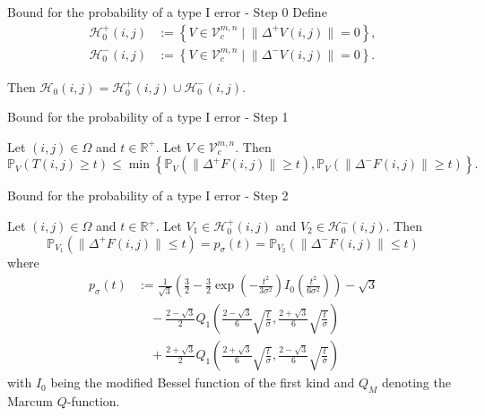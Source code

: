 \documentclass[presentation]{beamer}
\newcommand{\norm}[1]{\lVert#1\rVert}
\begin{document}
\begin{frame}{Bound for the probability of a type I error - Step 0}
	Define
	\begin{align*}
		\mathcal{H}_0^+(i, j) &:= \left\{ V \in \mathcal{V}_c^{m, n} \mid \norm{\Delta^+ V(i, j)} = 0 \right\}, \\
		\mathcal{H}_0^-(i, j) &:= \left\{ V \in \mathcal{V}_c^{m, n} \mid \norm{\Delta^- V(i, j)} = 0 \right\}.
	\end{align*}
	
	Then $\mathcal{H}_0(i, j) = \mathcal{H}_0^+(i, j) \cup \mathcal{H}_0^-(i, j)$.
\end{frame}

\begin{frame}{Bound for the probability of a type I error - Step 1}
	\begin{lemma}
		Let $(i, j) \in \Omega$ and $t \in \mathbb{R}^+$. Let $V \in \mathcal{V}_c^{m, n}$. Then
		\begin{equation*}
			\mathbb{P}_V( T(i, j) \geq t ) \leq \min \left\{ \mathbb{P}_V( \norm{\Delta^+ F(i, j)} \geq t ), \mathbb{P}_V( \norm{\Delta^- F(i, j)} \geq t ) \right\}.
		\end{equation*}
	\end{lemma}
\end{frame}

\begin{frame}{Bound for the probability of a type I error - Step 2}
	\begin{theorem}
		Let $(i, j) \in \Omega$ and $t \in \mathbb{R}^+$. Let $V_1 \in \mathcal{H}_0^+(i, j)$ and $V_2 \in \mathcal{H}_0^-(i, j)$. Then
		\begin{equation*}
			\mathbb{P}_{V_1}( \norm{\Delta^+ F(i, j)} \leq t ) = p_\sigma(t) = \mathbb{P}_{V_2}( \norm{\Delta^- F(i, j)} \leq t )
		\end{equation*}
		\pause
		where
		\begin{equation*}
			\begin{aligned}
				p_\sigma(t) &:= \frac{1}{\sqrt{3}} \left( \frac{3}{2} - \frac{3}{2} \exp \left( - \frac{t^2}{3 \sigma^2} \right) I_0 \left( \frac{t^2}{6 \sigma^2} \right) \right) - \sqrt{3} \\
				&\quad - \frac{2 - \sqrt{3}}{2} Q_1 \left( \frac{2 - \sqrt{3}}{6} \sqrt{\frac{t}{\sigma}}, \frac{2 + \sqrt{3}}{6} \sqrt{\frac{t}{\sigma}} \right) \\
				&\quad + \frac{2 + \sqrt{3}}{2} Q_1 \left( \frac{2 + \sqrt{3}}{6} \sqrt{\frac{t}{\sigma}}, \frac{2 - \sqrt{3}}{6} \sqrt{\frac{t}{\sigma}} \right)
			\end{aligned}
		\end{equation*}
		with $I_0$ being the modified Bessel function of the first kind and $Q_M$ denoting the Marcum $Q$-function.
	\end{theorem}
\end{frame}
\end{document}
